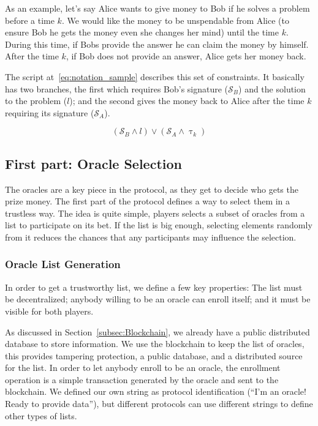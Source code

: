 As an example, let's say Alice wants to give money to Bob if he solves a problem
  before a time $k$.
We would like the money to be unspendable from Alice (to ensure Bob he gets the
  money even she changes her mind) until the time $k$.
During this time, if Bobs provide the answer he can claim the money by himself.
After the time $k$, if Bob does not provide an answer, Alice gets her money
  back.

The script at~\ref{eq:notation_sample} describes this set of constraints.
It basically has two branches, the first which requires Bob's signature
  ($\mathcal{S}_B$) and the solution to the problem ($l$); and the second gives
  the money back to Alice after the time $k$ requiring its signature
  ($\mathcal{S}_A$).

\begin{equation} \label{eq:notation_sample}
    (\mathcal{S}_B \wedge l) \vee (\mathcal{S}_A \wedge \uptau_k)
\end{equation}

\subsection{First part: Oracle Selection}

The oracles are a key piece in the protocol, as they get to decide who gets
  the prize money.
The first part of the protocol defines a way to select them in a trustless
  way.
The idea is quite simple, players selects a subset of oracles from a list
  to participate on its bet.
If the list is big enough, selecting elements randomly from it reduces the
  chances that any participants may influence the selection.

\subsubsection{Oracle List Generation}

In order to get a trustworthy list, we define a few key properties:
The list must be decentralized; anybody willing to be an oracle can
  enroll itself; and it must be visible for both players.

As discussed in Section~\ref{subsec:Blockchain}, we already have a public
  distributed database to store information.
We use the blockchain to keep the list of oracles, this provides tampering
  protection, a public database, and a distributed source for the list.
In order to let anybody enroll to be an oracle, the enrollment operation is a
  simple transaction generated by the oracle and sent to the blockchain.
We defined our own string as protocol identification
(``I'm an oracle! Ready to provide data''), but different protocols
  can use different strings to define other types of lists.

